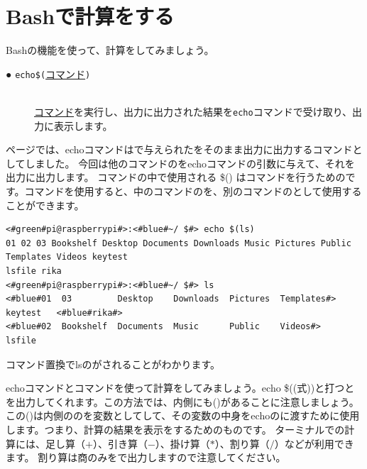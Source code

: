 \newpage
\section{Bashで計算をする}

Bashの機能を使って、計算をしてみましょう。
\begin{description}
    \item[● \texttt{echo}\textvisiblespace\texttt{\$(}\underline{コマンド}\texttt{)}]\mbox{}\\
    \underline{コマンド}を実行し、出力に出力された結果を\texttt{echo}コマンドで受け取り、出力に表示します。
\end{description}

\pageref{cmd:echo}ページでは、echoコマンドはで与えられたをそのまま出力に出力するコマンドとしてしました。
今回は他のコマンドのをechoコマンドの引数に与えて、それを出力に出力します。
コマンドの中で使用される \$() はコマンドを行うためのです。コマンドを使用すると、中のコマンドのを、別のコマンドのとして使用することができます。
\begin{lstlisting}[caption=echo コマンド置換を使った例1, label=cmdsbs:echo]
<#green#pi@raspberrypi#>:<#blue#~/ $#> echo $(ls)
01 02 03 Bookshelf Desktop Documents Downloads Music Pictures Public Templates Videos keytest
lsfile rika
<#green#pi@raspberrypi#>:<#blue#~/ $#> ls
<#blue#01  03         Desktop    Downloads  Pictures  Templates#>   keytest   <#blue#rika#>
<#blue#02  Bookshelf  Documents  Music      Public    Videos#>      lsfile
\end{lstlisting}
コマンド置換でlsのがされることがわかります。

echoコマンドとコマンドを使って計算をしてみましょう。echo \$((式))と打つとを出力してくれます。この方法では、内側にも()があることに注意しましょう。この()は内側ののを変数としてして、その変数の中身をechoのに渡すために使用します。つまり、計算の結果を表示をするためのものです。
ターミナルでの計算には、足し算（$+$）、引き算（$-$）、掛け算（$*$）、割り算（$/$）などが利用できます。 割り算は商のみをで出力しますので注意してください。


